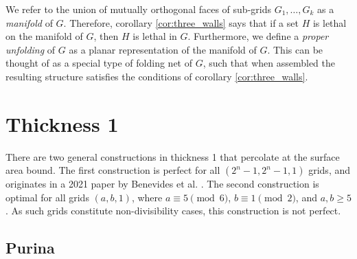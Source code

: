 

We refer to the union of mutually orthogonal faces of sub-grids $G_1, \dots, G_k$ as a \emph{manifold} of $G$. Therefore, corollary \ref{cor:three_walls} says that if a set $H$ is lethal on the manifold of $G$, then $H$ is lethal in $G$. Furthermore, we define a \emph{proper unfolding} of $G$ as a planar representation of the manifold of $G$. This can be thought of as a special type of folding net of $G$, such that when assembled the resulting structure satisfies the conditions of corollary \ref{cor:three_walls}. 


\section{Thickness 1}

There are two general constructions in thickness 1 that percolate at the surface area bound. The first construction is perfect for all $(2^n-1, 2^n-1, 1)$ grids, and originates in a 2021 paper by Benevides et al. \cite{benevides:2021}. The second construction is optimal for all grids $(a,b,1)$, where $a \equiv 5 \pmod 6$, $b \equiv 1 \pmod 2$, and $a,b \geq 5$. As such grids constitute non-divisibility cases, this construction is not perfect.

\subsection{Purina}

